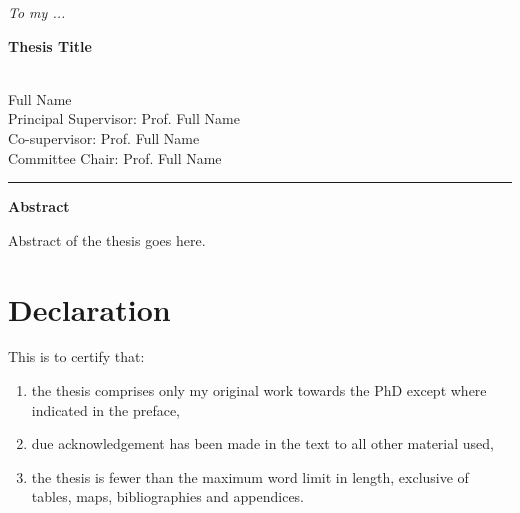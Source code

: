 \documentclass[12pt, a4paper, twoside]{book}
\newcommand{\thesistitle}{Thesis Title}
\newcommand{\thesisauthor}{Full Name}
\newcommand{\thesiscosupervisor}{Prof. Full Name}
\newcommand{\thesiscommitteechair}{Prof. Full Name}
\newcommand{\authordedicateto}{To my ...} %
\begin{document}
\thispagestyle{empty}
\vspace*{\fill}
\begin{center}
\emph{\authordedicateto}
\end{center}
\vfill
\clearpage
\thispagestyle{plain}

%

\begin{center}

\begin{Large}
\textbf{\thesistitle}
\end{Large}
\\
\vspace{0.1cm}
\thesisauthor \\
\vspace{0.5cm}
Principal Supervisor: \thesiscosupervisor \\
Co-supervisor: \thesiscosupervisor\\
Committee Chair: \thesiscommitteechair
\end{center}
\hrule

\begin{center} \textbf{Abstract} \end{center}
\vspace{-0.15in}

Abstract of the thesis goes here.

%
\chapter*{Declaration}
This is to certify that:
\begin{enumerate}
    \item[i.] the thesis comprises only my original work towards the PhD except where indicated in the preface,
    \item[ii.] due acknowledgement has been made in the text to all other material used,
    \item[iii.] the thesis is fewer than the maximum word limit in length, exclusive of tables, maps, bibliographies and appendices.
\end{enumerate}
\vspace{1.5cm}
\end{document}
